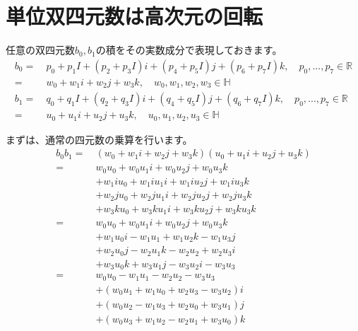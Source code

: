 \documentclass[a4paper,12pt,notitlepage]{jsreport}
\begin{document}
\section{単位双四元数は高次元の回転}

任意の双四元数$b_0,b_1$の積をその実数成分で表現しておきます。
\begin{equation}
\begin{split}
b_0=~&p_0+p_1I+(p_2+p_3I)i+(p_4+p_5I)j+(p_6+p_7I)k,\quad p_0,...,p_7\in\mathbb{R}\\
=~&w_0+w_1i+w_2j+w_3k,\quad w_0,w_1,w_2,w_3\in\mathbb{H}\\
b_1=~&q_0+q_1I+(q_2+q_3I)i+(q_4+q_5I)j+(q_6+q_7I)k,\quad p_0,...,p_7\in\mathbb{R}\\
=~&u_0+u_1i+u_2j+u_3k,\quad u_0,u_1,u_2,u_3\in\mathbb{H}
\end{split}
\end{equation}

まずは、通常の四元数の乗算を行います。
\begin{equation}
\begin{split}
b_0b_1=~&(w_0+w_1i+w_2j+w_3k)(u_0+u_1i+u_2j+u_3k)\\
=~&w_0u_0+w_0u_1i+w_0u_2j+w_0u_3k\\
&+w_1iu_0+w_1iu_1i+w_1iu_2j+w_1iu_3k\\
&+w_2ju_0+w_2ju_1i+w_2ju_2j+w_2ju_3k\\
&+w_3ku_0+w_3ku_1i+w_3ku_2j+w_3ku_3k\\
=~&w_0u_0+w_0u_1i+w_0u_2j+w_0u_3k\\
&+w_1u_0i-w_1u_1+w_1u_2k-w_1u_3j\\
&+w_2u_0j-w_2u_1k-w_2u_2+w_2u_3i\\
&+w_3u_0k+w_3u_1j-w_3u_2i-w_3u_3\\
=~&w_0u_0-w_1u_1-w_2u_2-w_3u_3\\
&+(w_0u_1+w_1u_0+w_2u_3-w_3u_2)i\\
&+(w_0u_2-w_1u_3+w_2u_0+w_3u_1)j\\
&+(w_0u_3+w_1u_2-w_2u_1+w_3u_0)k
\end{split}
\end{equation}
\end{document}
